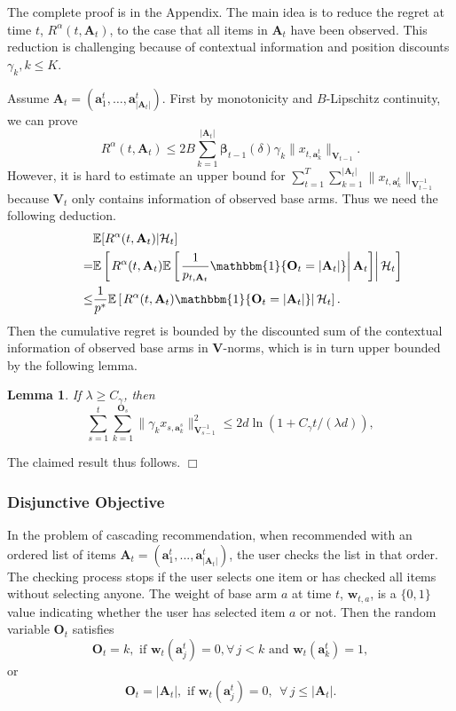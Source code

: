 \documentclass{article}
\newcommand{\bbeta}{\boldsymbol{\beta}}
\newcommand{\EE}{\mathbb{E}}
\newcommand{\bOne}{\mathbbm{1}}
\newcommand{\bA}{\mathbf{A}}
\newcommand{\ba}{\mathbf{a}}
\newcommand{\bO}{\mathbf{O}}
\newcommand{\bV}{\mathbf{V}}
\newcommand{\bw}{\mathbf{w}}
\newcommand{\cH}{\mathcal{H}}
\newcommand{\abs}[1]{\left| #1 \right|}
\newcommand{\norm}[1]{\| #1 \|}
\newtheorem{lemma}[theorem]{Lemma}%
\newenvironment{proof}{\noindent {\textbf{Proof. }}}{$\Box$ \medskip}
\begin{document}
\begin{proof}%
	The complete proof is in the Appendix. The main idea is to reduce the regret at time $t$, $R^{\alpha}(t, \bA_t)$, to the case that all items in $\bA_t$ have been observed. This reduction is challenging because of contextual information and position discounts $\gamma_k, k \leq K$. 
	
	Assume $\bA_t = (\ba_1^t, \ldots, \ba_{|\bA_t|}^t)$. First by monotonicity and $B$-Lipschitz continuity, we can prove
	$$
		R^{\alpha}(t, \bA_t) \leq 2B \sum_{k=1}^{|\bA_t|} \bbeta_{t-1}(\delta) \gamma_k \| x_{t, \ba_k^t} \|_{\bV_{t-1}}.
	$$
	However, it is hard to estimate an upper bound for $\sum_{t=1}^T \sum_{k=1}^{\abs{\bA_t}} \norm{ x_{t, \ba_k^t} }_{ \bV_{t-1}^{-1} }$ because $\bV_t$ only contains information of observed base arms. Thus we need the following deduction.
	\begin{align*}
    	&\EE[R^{\alpha}(t, \bA_t)|\cH_t] \\
    	\qquad = &\EE \left[ \left. R^{\alpha}(t, \bA_t) \EE \left[ \left. \frac{1}{p_{t, \bA_t}} \bOne\{\bO_t = \abs{\bA_t}\} \right| \bA_t \right]  \right| \cH_t \right]\\
    	\qquad \leq & \frac{1}{p^*} \EE \left[ \left. R^{\alpha}(t, \bA_t) \bOne\{\bO_t = \abs{\bA_t}\} \right| \cH_t \right].
    \end{align*}
    Then the cumulative regret is bounded by the discounted sum of the contextual information of observed base arms in $\bV$-norms, which is in turn upper bounded by the following lemma.
    \begin{lemma}
    	\label{lem:XNormSumEst}
    	If $\lambda \geq C_{\gamma}$, then
    	$$
    	\sum_{s=1}^t \sum_{k=1}^{\bO_s} \norm{\gamma_k x_{s,\ba_{k}^s}}_{\bV_{s-1}^{-1}}^2 \leq 2d\ln \left(1 + C_{\gamma}t/(\lambda d)\right),
    	$$
    \end{lemma}
    The claimed result thus follows.
\end{proof}

\subsubsection{Disjunctive Objective}
\label{sec:disj}

In the problem of cascading recommendation, when recommended with an ordered list of items $\bA_t = (\ba_{1}^t,...,\ba_{\abs{\bA_t}}^t)$, the user checks the list in that order. The checking process stops if the user selects one item or has checked all items without selecting anyone. The weight of base arm $a$ at time $t$, $\bw_{t,a}$, is a $\{0,1\}$ value indicating whether the user has selected item $a$ or not. Then the random variable $\bO_t$ satisfies
$$
\bO_t = k, \text{ if } \bw_t(\ba_j^t)=0, \forall\, j < k \text{ and } \bw_t(\ba_k^t) = 1,
$$
or 
$$
\bO_t = \abs{\bA_t}, \text{ if }\bw_t(\ba_j^t) = 0, ~~ \forall\, j \leq \abs{\bA_t}.
$$
\end{document}

